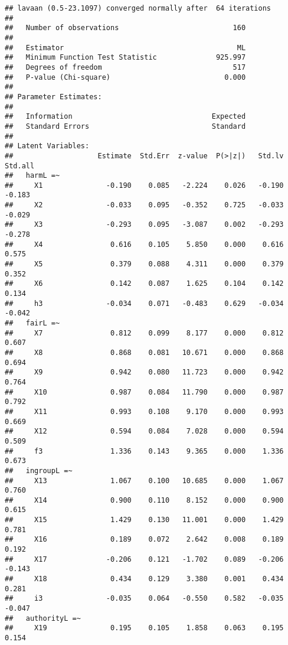 \documentclass[english,man]{apa6}
\newcounter{author}
\theoremstyle{definition}
\theoremstyle{definition}
\theoremstyle{definition}
\theoremstyle{remark}
\begin{document}
\begin{verbatim}
## lavaan (0.5-23.1097) converged normally after  64 iterations
## 
##   Number of observations                           160
## 
##   Estimator                                         ML
##   Minimum Function Test Statistic              925.997
##   Degrees of freedom                               517
##   P-value (Chi-square)                           0.000
## 
## Parameter Estimates:
## 
##   Information                                 Expected
##   Standard Errors                             Standard
## 
## Latent Variables:
##                    Estimate  Std.Err  z-value  P(>|z|)   Std.lv  Std.all
##   harmL =~                                                              
##     X1               -0.190    0.085   -2.224    0.026   -0.190   -0.183
##     X2               -0.033    0.095   -0.352    0.725   -0.033   -0.029
##     X3               -0.293    0.095   -3.087    0.002   -0.293   -0.278
##     X4                0.616    0.105    5.850    0.000    0.616    0.575
##     X5                0.379    0.088    4.311    0.000    0.379    0.352
##     X6                0.142    0.087    1.625    0.104    0.142    0.134
##     h3               -0.034    0.071   -0.483    0.629   -0.034   -0.042
##   fairL =~                                                              
##     X7                0.812    0.099    8.177    0.000    0.812    0.607
##     X8                0.868    0.081   10.671    0.000    0.868    0.694
##     X9                0.942    0.080   11.723    0.000    0.942    0.764
##     X10               0.987    0.084   11.790    0.000    0.987    0.792
##     X11               0.993    0.108    9.170    0.000    0.993    0.669
##     X12               0.594    0.084    7.028    0.000    0.594    0.509
##     f3                1.336    0.143    9.365    0.000    1.336    0.673
##   ingroupL =~                                                           
##     X13               1.067    0.100   10.685    0.000    1.067    0.760
##     X14               0.900    0.110    8.152    0.000    0.900    0.615
##     X15               1.429    0.130   11.001    0.000    1.429    0.781
##     X16               0.189    0.072    2.642    0.008    0.189    0.192
##     X17              -0.206    0.121   -1.702    0.089   -0.206   -0.143
##     X18               0.434    0.129    3.380    0.001    0.434    0.281
##     i3               -0.035    0.064   -0.550    0.582   -0.035   -0.047
##   authorityL =~                                                         
##     X19               0.195    0.105    1.858    0.063    0.195    0.154

\end{verbatim}
\end{document}
